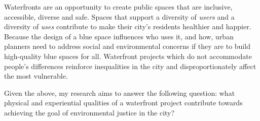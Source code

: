 \documentclass{article}
\begin{document}
Waterfronts are an opportunity to create public spaces that are inclusive, accessible, diverse and safe. Spaces that support a diversity of \textit{users} and a diversity of \textit{uses} contribute to make their city's residents healthier and happier.
Because the design of a blue space influences who uses it, and how, urban planners need to address social and environmental concerns if they are to build high-quality blue spaces for all.
Waterfront projects which do not accommodate people's differences reinforce inequalities in the city and disproportionately affect the most vulnerable.

Given the above, my research aims to answer the following question: what physical and experiential qualities of a waterfront project contribute towards achieving the goal of environmental justice in the city?

\pagebreak

\printbibliography
\end{document}
